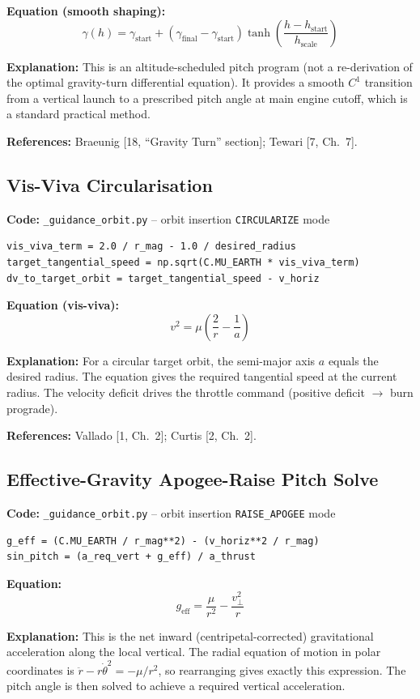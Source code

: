 \documentclass[12pt,a4paper]{article}
\begin{document}
\textbf{Equation (smooth shaping):}
\[
\gamma(h) = \gamma_{\text{start}} + (\gamma_{\text{final}} - \gamma_{\text{start}})\tanh\!\left(\frac{h - h_{\text{start}}}{h_{\text{scale}}}\right)
\]

\textbf{Explanation:} This is an altitude-scheduled pitch program (not a re-derivation of the optimal gravity-turn differential equation). It provides a smooth $C^1$ transition from a vertical launch to a prescribed pitch angle at main engine cutoff, which is a standard practical method.

\textbf{References:} Braeunig [18, ``Gravity Turn'' section]; Tewari [7, Ch.~7].

\subsection{Vis-Viva Circularisation}

\textbf{Code:} \texttt{\_guidance\_orbit.py} – orbit insertion \texttt{CIRCULARIZE} mode
\begin{verbatim}
vis_viva_term = 2.0 / r_mag - 1.0 / desired_radius
target_tangential_speed = np.sqrt(C.MU_EARTH * vis_viva_term)
dv_to_target_orbit = target_tangential_speed - v_horiz
\end{verbatim}

\textbf{Equation (vis-viva):}
\[
v^2 = \mu\left(\frac{2}{r} - \frac{1}{a}\right)
\]

\textbf{Explanation:} For a circular target orbit, the semi-major axis $a$ equals the desired radius. The equation gives the required tangential speed at the current radius. The velocity deficit drives the throttle command (positive deficit $\rightarrow$ burn prograde).

\textbf{References:} Vallado [1, Ch.~2]; Curtis [2, Ch.~2].

\subsection{Effective-Gravity Apogee-Raise Pitch Solve}

\textbf{Code:} \texttt{\_guidance\_orbit.py} – orbit insertion \texttt{RAISE\_APOGEE} mode
\begin{verbatim}
g_eff = (C.MU_EARTH / r_mag**2) - (v_horiz**2 / r_mag)
sin_pitch = (a_req_vert + g_eff) / a_thrust
\end{verbatim}

\textbf{Equation:}
\[
g_{\text{eff}} = \frac{\mu}{r^2} - \frac{v_{\perp}^2}{r}
\]

\textbf{Explanation:} This is the net inward (centripetal-corrected) gravitational acceleration along the local vertical. The radial equation of motion in polar coordinates is $\ddot{r} - r\dot{\theta}^2 = -\mu/r^2$, so rearranging gives exactly this expression. The pitch angle is then solved to achieve a required vertical acceleration.
\end{document}
